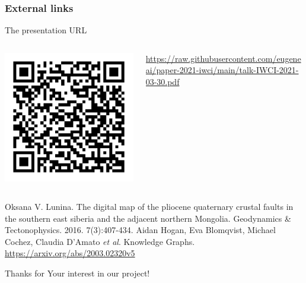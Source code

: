 \documentclass[10pt]{beamer}
\begin{document}
\begin{frame}
  \frametitle{External links}
  The presentation URL
  \begin{columns}
    \begin{column}{0.3\textwidth}
      \includegraphics[width=1\linewidth]{talk.pdf}
    \end{column}
    \begin{column}{0.7\textwidth}
      \url{https://raw.githubusercontent.com/eugeneai/paper-2021-iwci/main/talk-IWCI-2021-03-30.pdf}
    \end{column}
  \end{columns}
\begin{thebibliography}{99}

Oksana V. Lunina.  The digital map of the pliocene quaternary crustal faults in the southern east siberia and the adjacent northern Mongolia. Geodynamics \& Tectonophysics. 2016. 7(3):407-434. 
  Aidan Hogan, Eva Blomqvist, Michael Cochez, Claudia D’Amato \emph{et al}. Knowledge Graphs.
  \url{https://arxiv.org/abs/2003.02320v5}
\end{thebibliography}
\end{frame}

\begin{frame}
  \begin{center}
  \Large Thanks for Your interest in our project!
\end{center}
\end{frame}
\end{document}
